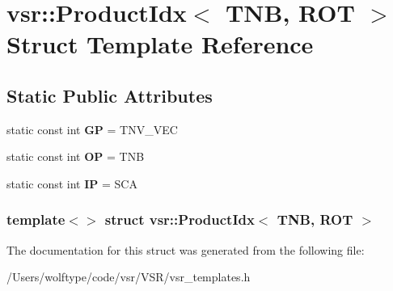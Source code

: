 \hypertarget{structvsr_1_1_product_idx_3_01_t_n_b_00_01_r_o_t_01_4}{\section{vsr\-:\-:Product\-Idx$<$ T\-N\-B, R\-O\-T $>$ Struct Template Reference}
\label{structvsr_1_1_product_idx_3_01_t_n_b_00_01_r_o_t_01_4}
}
\subsection*{Static Public Attributes}
\begin{DoxyCompactItemize}
\item 
\hypertarget{structvsr_1_1_product_idx_3_01_t_n_b_00_01_r_o_t_01_4_ad7dbeeee61c38029f9c58f051f527f5f}{static const int {\bfseries G\-P} = T\-N\-V\-\_\-\-V\-E\-C}\label{structvsr_1_1_product_idx_3_01_t_n_b_00_01_r_o_t_01_4_ad7dbeeee61c38029f9c58f051f527f5f}

\item 
\hypertarget{structvsr_1_1_product_idx_3_01_t_n_b_00_01_r_o_t_01_4_a04ba9653263497e33fb1647c4ebdfb2f}{static const int {\bfseries O\-P} = T\-N\-B}\label{structvsr_1_1_product_idx_3_01_t_n_b_00_01_r_o_t_01_4_a04ba9653263497e33fb1647c4ebdfb2f}

\item 
\hypertarget{structvsr_1_1_product_idx_3_01_t_n_b_00_01_r_o_t_01_4_a4f7713ecefd9887ff20e3b81baf0c3cc}{static const int {\bfseries I\-P} = S\-C\-A}\label{structvsr_1_1_product_idx_3_01_t_n_b_00_01_r_o_t_01_4_a4f7713ecefd9887ff20e3b81baf0c3cc}

\end{DoxyCompactItemize}
\subsubsection*{template$<$$>$ struct vsr\-::\-Product\-Idx$<$ T\-N\-B, R\-O\-T $>$}



The documentation for this struct was generated from the following file\-:\begin{DoxyCompactItemize}
\item 
/\-Users/wolftype/code/vsr/\-V\-S\-R/vsr\-\_\-templates.\-h\end{DoxyCompactItemize}
